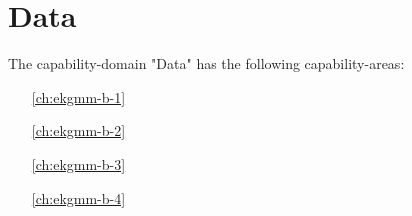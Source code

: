 \part{Data}

The capability-domain "Data" has the following capability-areas:

\begin{itemize}[leftmargin=.5in]
  \item [\ref{ch:ekgmm-b-1}] 
  \item [\ref{ch:ekgmm-b-2}] 
  \item [\ref{ch:ekgmm-b-3}] 
  \item [\ref{ch:ekgmm-b-4}] 
\end{itemize}

\setcounter{chapter}{0}





